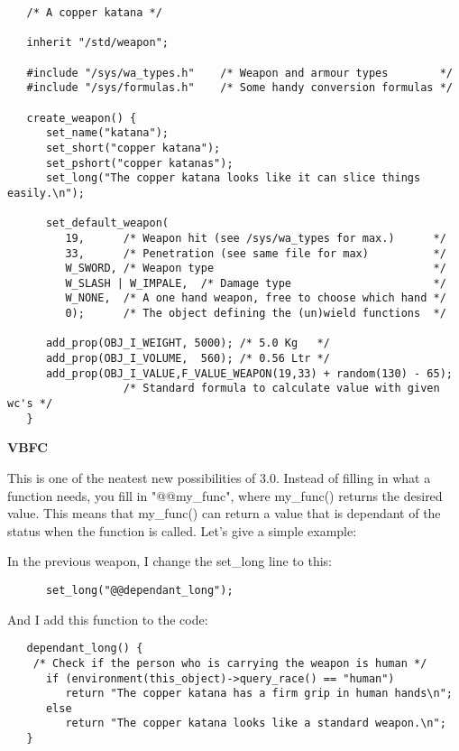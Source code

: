 \begin{verbatim}
   /* A copper katana */

   inherit "/std/weapon";

   #include "/sys/wa_types.h"    /* Weapon and armour types        */
   #include "/sys/formulas.h"    /* Some handy conversion formulas */

   create_weapon() {
      set_name("katana");
      set_short("copper katana");
      set_pshort("copper katanas");
      set_long("The copper katana looks like it can slice things easily.\n");

      set_default_weapon(
         19,      /* Weapon hit (see /sys/wa_types for max.)      */
         33,      /* Penetration (see same file for max)          */
         W_SWORD, /* Weapon type                                  */
         W_SLASH | W_IMPALE,  /* Damage type                      */
         W_NONE,  /* A one hand weapon, free to choose which hand */
         0);      /* The object defining the (un)wield functions  */

      add_prop(OBJ_I_WEIGHT, 5000); /* 5.0 Kg   */
      add_prop(OBJ_I_VOLUME,  560); /* 0.56 Ltr */
      add_prop(OBJ_I_VALUE,F_VALUE_WEAPON(19,33) + random(130) - 65);
                  /* Standard formula to calculate value with given wc's */
   }
\end{verbatim}

{\bf VBFC}

This is one of the neatest new possibilities of 3.0. Instead of filling in
what a function needs, you fill in "@@my\_func", where my\_func() returns the
desired value. This means that my\_func() can return a value that is dependant
of the status when the function is called. Let's give a simple example:

In the previous weapon, I change the set\_long line to this:

\begin{verbatim}
      set_long("@@dependant_long");
\end{verbatim}

And I add this function to the code:

\begin{verbatim}
   dependant_long() {
    /* Check if the person who is carrying the weapon is human */
      if (environment(this_object)->query_race() == "human")
         return "The copper katana has a firm grip in human hands\n";
      else
         return "The copper katana looks like a standard weapon.\n";
   }
\end{verbatim}

